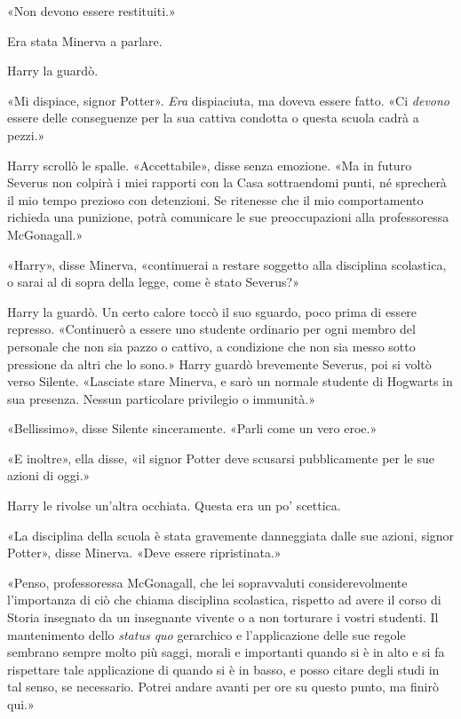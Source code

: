 «Non devono essere restituiti.»

Era stata Minerva a parlare.

Harry la guardò.

«Mi dispiace, signor Potter». \textit{Era} dispiaciuta, ma doveva essere fatto. «Ci \textit{devono} essere delle conseguenze per la sua cattiva condotta o questa scuola cadrà a pezzi.»

Harry scrollò le spalle. «Accettabile», disse senza emozione. «Ma in futuro Severus non colpirà i miei rapporti con la Casa sottraendomi punti, né sprecherà il mio tempo prezioso con detenzioni. Se ritenesse che il mio comportamento richieda una punizione, potrà comunicare le sue preoccupazioni alla professoressa McGonagall.»

«Harry», disse Minerva, «continuerai a restare soggetto alla disciplina scolastica, o sarai al di sopra della legge, come è stato Severus?»

Harry la guardò. Un certo calore toccò il suo sguardo, poco prima di essere represso. «Continuerò a essere uno studente ordinario per ogni membro del personale che non sia pazzo o cattivo, a condizione che non sia messo sotto pressione da altri che lo sono.» Harry guardò brevemente Severus, poi si voltò verso Silente. «Lasciate stare Minerva, e sarò un normale studente di Hogwarts in sua presenza. Nessun particolare privilegio o immunità.»

«Bellissimo», disse Silente sinceramente. «Parli come un vero eroe.»

«E inoltre», ella disse, «il signor Potter deve scusarsi pubblicamente per le sue azioni di oggi.»

Harry le rivolse un’altra occhiata. Questa era un po’ scettica.

«La disciplina della scuola è stata gravemente danneggiata dalle sue azioni, signor Potter», disse Minerva. «Deve essere ripristinata.»

«Penso, professoressa McGonagall, che lei sopravvaluti considerevolmente l’importanza di ciò che chiama disciplina scolastica, rispetto ad avere il corso di Storia insegnato da un insegnante vivente o a non torturare i vostri studenti. Il mantenimento dello \textit{status quo} gerarchico e l’applicazione delle sue regole sembrano sempre molto più saggi, morali e importanti quando si è in alto e si fa rispettare tale applicazione di quando si è in basso, e posso citare degli studi in tal senso, se necessario. Potrei andare avanti per ore su questo punto, ma finirò qui.»

